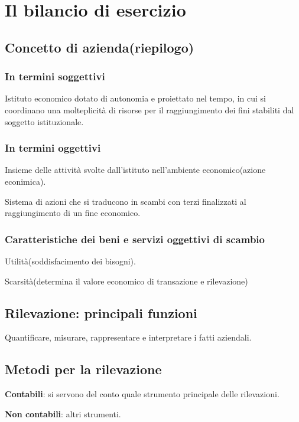 \section{Il bilancio di esercizio}

\subsection{Concetto di azienda(riepilogo)}

\subsubsection{In termini soggettivi}
Istituto economico dotato di autonomia e proiettato nel tempo, in cui si coordinano una molteplicità
di risorse per il raggiungimento dei fini stabiliti dal soggetto istituzionale.

\subsubsection{In termini oggettivi}
Insieme delle attività svolte dall'istituto nell'ambiente economico(azione econimica).

Sistema di azioni che si traducono in scambi con terzi finalizzati al raggiungimento di un fine economico.


\subsubsection{Caratteristiche dei beni e servizi oggettivi di scambio}

Utilità(soddisfacimento dei bisogni).

Scarsità(determina il valore economico di transazione e rilevazione)


\subsection{Rilevazione: principali funzioni}

Quantificare, misurare, rappresentare e interpretare i fatti aziendali.

\subsection{Metodi per la rilevazione}
\textbf{Contabili}: si servono del conto quale strumento principale delle rilevazioni.

\textbf{Non contabili}: altri strumenti.

